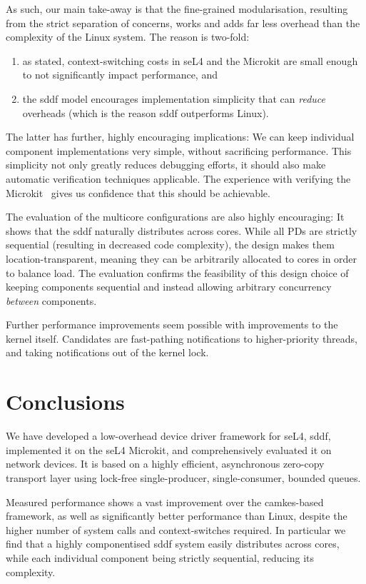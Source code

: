 \documentclass[a4paper,12pt]{report}
\begin{document}
As such, our main take-away is that the fine-grained modularisation,
resulting from the strict separation of concerns, works and adds
far less overhead than the complexity of the Linux system. The reason is two-fold:
\begin{enumerate}
\item as stated, context-switching costs in seL4 and the Microkit are
  small enough to not significantly impact performance, and
\item the \gls{sddf} model encourages implementation simplicity that can
  \emph{reduce} overheads (which is the reason \gls{sddf} outperforms Linux).
\end{enumerate}

The latter has further, highly encouraging implications: We can keep
individual component implementations very simple, without sacrificing
performance. This simplicity not only greatly reduces debugging
efforts, it should also make automatic verification techniques
applicable. The experience with verifying the
Microkit~\citep{Paturel_SH_23} gives us confidence that this should be
achievable.

The evaluation of the multicore configurations are also highly encouraging: It shows that the \gls{sddf}
naturally distributes across cores. While all PDs are strictly
sequential (resulting in decreased code complexity), the design makes
them location-transparent, meaning they can be arbitrarily allocated to cores
in order to balance load. The evaluation confirms the feasibility of
this design choice of keeping components sequential and instead allowing arbitrary concurrency
\emph{between} components.

Further performance improvements seem possible with improvements to
the kernel itself. Candidates are fast-pathing notifications to
higher-priority threads, and taking notifications out of the kernel lock.

\chapter{Conclusions}

We have developed a low-overhead device driver
framework for seL4, \gls{sddf}, implemented it on the seL4 Microkit, and
comprehensively evaluated it on network devices. It is based
on a highly efficient, asynchronous zero-copy transport layer using
lock-free single-producer, single-consumer, bounded queues.

Measured performance shows a vast improvement over the
\gls{camkes}-based framework, as well as significantly better performance than
Linux, despite the higher number of system calls and context-switches
required. In particular we find that a highly componentised \gls{sddf}
system easily distributes across cores, while each individual
component being strictly sequential, reducing its complexity.
\end{document}
